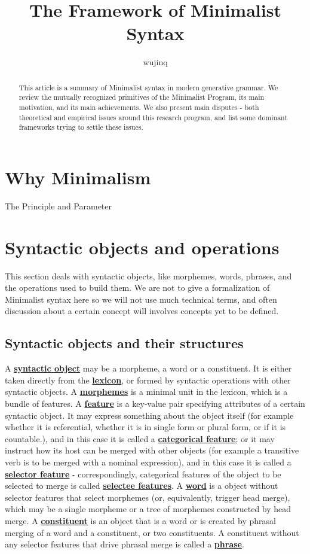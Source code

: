 \documentclass[a4paper]{article}
\title{The Framework of Minimalist Syntax}
\author{wujinq}
\newcommand*{\concept}[1]{\underline{\textbf{#1}}}
\begin{document}
\maketitle

\begin{abstract}
    This article is a summary of Minimalist syntax in modern generative grammar.
    We review the mutually recognized primitives of the Minimalist Program, its main motivation, and its main achievements.
    We also present main disputes - both theoretical and empirical issues around this research program, and list some dominant frameworks trying to settle these issues.  
\end{abstract}

\section{Why Minimalism}

The Principle and Parameter 

\section{Syntactic objects and operations}\label{sec:syn-obj}

This section deals with syntactic objects, like morphemes, words, phrases, and the operations used to build them.
We are not to give a formalization of Minimalist syntax here so we will not use much technical terms, 
and often discussion about a certain concept will involves concepts yet to be defined.

\subsection{Syntactic objects and their structures}

A \concept{syntactic object} may be a morpheme, a word or a constituent.
It is either taken directly from the \concept{lexicon}, 
or formed by syntactic operations with other syntactic objects.
A \concept{morphemes} is a minimal unit in the lexicon, which is a bundle of features.
A \concept{feature} is a key-value pair specifying attributes of a certain syntactic object.
It may express something about the object itself 
(for example whether it is referential, whether it is in single form or plural form, or if it is countable.), 
and in this case it is called a \concept{categorical feature};
or it may instruct how its host can be merged with other objects 
(for example a transitive verb is to be merged with a nominal expression), 
and in this case it is called a \concept{selector feature}
 - correspondingly, categorical features of the object to be selected to merge is called \concept{selectee features}.
A \concept{word} is a object without selector features that select morphemes (or, equivalently, trigger head merge), 
which may be a single morpheme or a tree of morphemes constructed by head merge.
A \concept{constituent} is an object 
that is a word or is created by phrasal merging of a word and a constituent, or two constituents.
A constituent without any selector features that drive phrasal merge is called a \concept{phrase}.
\end{document}
